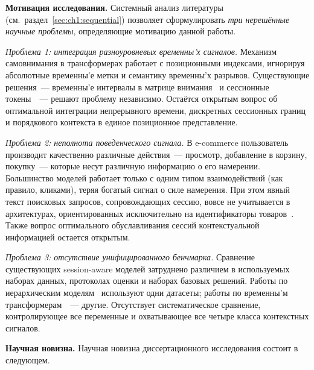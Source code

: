 \textbf{Мотивация исследования.}
Системный анализ литературы (см.\ раздел~\ref{sec:ch1:sequential}) позволяет сформулировать \textit{три нерешённые научные проблемы}, определяющие мотивацию данной работы.

\textit{Проблема 1: интеграция разноуровневых временны'х сигналов.}
Механизм самовнимания в трансформерах работает с позиционными индексами, игнорируя абсолютные временны'е метки и семантику временны'х разрывов. Существующие решения~--- временны'е интервалы в матрице внимания~\cite{li2020tisasrec} и сессионные токены~\cite{seol2022session}~--- решают проблему независимо. 
Остаётся открытым вопрос об оптимальной интеграции непрерывного времени, дискретных сессионных границ и порядкового контекста в единое позиционное представление.

\textit{Проблема 2: неполнота поведенческого сигнала.}
В e-commerce пользователь производит качественно различные действия~--- просмотр, добавление в корзину, покупку~--- которые несут различную информацию о его намерении. 
Большинство моделей работает только с одним типом взаимодействий (как правило, кликами), теряя богатый сигнал о силе намерения. 
При этом явный текст поисковых запросов, сопровождающих сессию, вовсе не учитывается в архитектурах, ориентированных исключительно на идентификаторы товаров~\cite{kang2018sasrec, sun2019bert4rec}. 
Также вопрос оптимального обуславливания сессий контекстуальной информацией остается открытым. 

\textit{Проблема 3: отсутствие унифицированного бенчмарка.}
Сравнение существующих session-aware моделей затруднено различием в используемых наборах данных, протоколах оценки и наборах базовых решений. 
Работы по иерархическим моделям~\cite{quadrana2017hrnn, cui2019hierarchical} используют одни датасеты; работы по временны'м трансформерам~\cite{li2020tisasrec, tran2023mojito}~--- другие. 
Отсутствует систематическое сравнение, контролирующее все переменные и охватывающее все четыре класса контекстных сигналов.

\textbf{Научная новизна.}
Научная новизна диссертационного исследования состоит в следующем.

